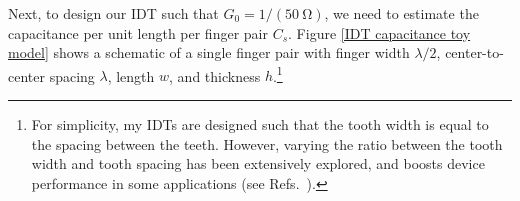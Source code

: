 \documentclass[double,12pt,1in,seploa]{beavtex}
\begin{document}
Next, to design our IDT such that $G_0 = 1/(\SI{50}{\ohm})$, we need to estimate the capacitance per unit length per finger pair $C_s$. Figure \ref{IDT capacitance toy model} shows a schematic of a single finger pair with finger width $\lambda/2$, center-to-center spacing $\lambda$, length $w$, and thickness $h$.\footnote{For simplicity, my IDTs are designed such that the tooth width is equal to the spacing between the teeth. However, varying the ratio between the tooth width and tooth spacing has been extensively explored, and boosts device performance in some applications (see Refs.\ \cite{datta_surface_1986, campbell_surface_1989}).}



\end{document}
